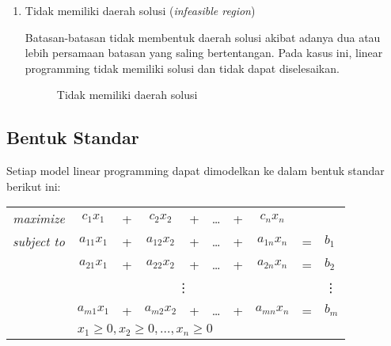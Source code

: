 \begin{enumerate}
	\item Tidak memiliki daerah solusi (\textit{infeasible region})

		Batasan-batasan tidak membentuk daerah solusi akibat adanya dua atau lebih persamaan batasan yang saling bertentangan. Pada kasus ini, linear programming tidak memiliki solusi dan tidak dapat diselesaikan.
			
		\begin{figure}[H]
    		\centering
			\caption{Tidak memiliki daerah solusi}
    	\end{figure}

\end{enumerate}

\subsection{Bentuk Standar}
\label{bentuk_standar}

Setiap model linear programming dapat dimodelkan ke dalam bentuk standar berikut ini:
    	
\begin{center}
	\begin{tabular}{r c @{}c @{}c @{}c @{}c @{}c @{}c c l}
	    \textit{maximize}	& $c_1x_1$    & + & $c_2x_2$    & + & \dots & + & $c_nx_n$ \\
		\textit{subject to} & $a_{11}x_1$ & + & $a_{12}x_2$ & + & \dots & + & $a_{1n}x_n$ & = & $b_1$ \\
    						& $a_{21}x_1$ & + & $a_{22}x_2$ & + & \dots & + & $a_{2n}x_n$ & = & $b_2$ \\
                            & \multicolumn{7}{c}{\vdots}                                  &   & \vdots \\
                            & $a_{m1}x_1$ & + & $a_{m2}x_2$ & + & \dots & + & $a_{mn}x_n$ & = & $b_m$ \\
                            & \multicolumn{9}{l}{$x_1\geq0,x_2\geq0,\dots,x_n\geq0$}
	\end{tabular}
\end{center}

